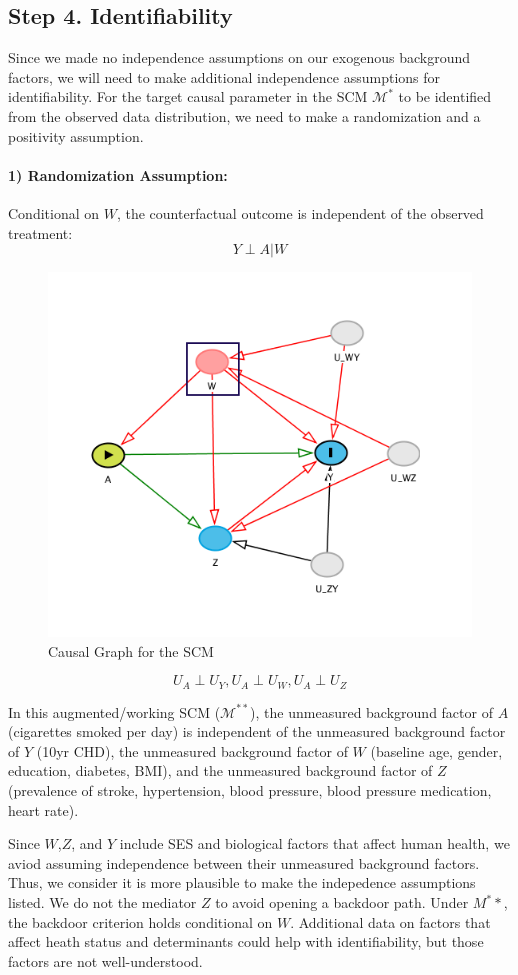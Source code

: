 \documentclass[]{article}
\let\oldparagraph\paragraph
\renewcommand{\paragraph}[1]{\oldparagraph{#1}\mbox{}}
\begin{document}
\subsection{Step 4. Identifiability}\label{step-4.-identifiability}

Since we made no independence assumptions on our exogenous background
factors, we will need to make additional independence assumptions for
identifiability. For the target causal parameter in the SCM
\(\mathcal{M^*}\) to be identified from the observed data distribution,
we need to make a randomization and a positivity assumption.

\paragraph{1) Randomization Assumption:}\label{randomization-assumption}

Conditional on \(W\), the counterfactual outcome is independent of the
observed treatment: \[ Y \perp  A|W\]

\begin{figure}

{\centering \includegraphics[width=0.5\linewidth]{./dags/augmented_dag} 

}

\caption{Causal Graph for the SCM}\label{fig:figc}
\end{figure}

\[U_A\perp U_Y,U_A\perp U_W,U_A\perp U_Z\]

In this augmented/working SCM (\(\mathcal{M^{**}}\)), the unmeasured
background factor of \(A\) (cigarettes smoked per day) is independent of
the unmeasured background factor of \(Y\) (10yr CHD), the unmeasured
background factor of \(W\) (baseline age, gender, education, diabetes,
BMI), and the unmeasured background factor of \(Z\) (prevalence of
stroke, hypertension, blood pressure, blood pressure medication, heart
rate).

Since \(W\),\(Z\), and \(Y\) include SES and biological factors that
affect human health, we aviod assuming independence between their
unmeasured background factors. Thus, we consider it is more plausible to
make the indepedence assumptions listed. We do not the mediator \(Z\) to
avoid opening a backdoor path. Under \(M^**\), the backdoor criterion
holds conditional on \(W\). Additional data on factors that affect heath
status and determinants could help with identifiability, but those
factors are not well-understood.
\end{document}
